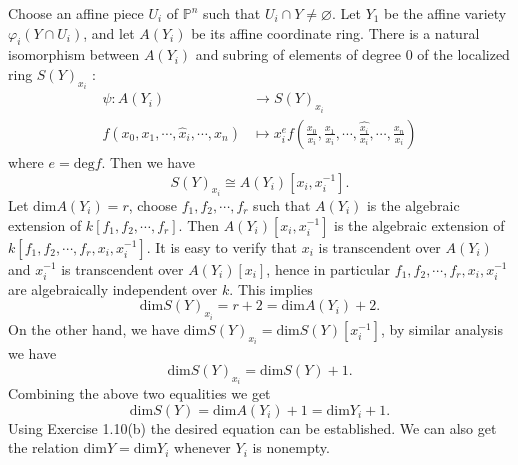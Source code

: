   \begin{solution}
    Choose an affine piece $U_i$ of $\mathbb{P}^{n}$ such that $U_i\cap Y\neq \varnothing$. Let $Y_1$ be the affine variety  $\varphi_i(Y\cap U_i)$, and let $A(Y_i)$ be its affine coordinate ring. There is a natural isomorphism between $A(Y_i)$ and subring of elements of degree  $0$ of the localized ring $S(Y)_{x_i}$ :
    \begin{align*}
      \psi: A(Y_i) &\longrightarrow S(Y)_{x_i} \\
      f(x_0,x_1,\cdots,\hat{x}_i,\cdots,x_n) &\longmapsto x_i^{e}f\left( \frac{x_0}{x_i}, \frac{x_1}{x_i},\cdots,\widehat{\frac{x_i}{x_i}},\cdots,\frac{x_n}{x_i} \right) 
    \end{align*}
   where $e=\mathrm{deg}f$.
    Then we have 
    \[
      S(Y)_{x_i}\cong A(Y_i)[x_i,x_i^{-1}].
    \] 
    Let $\mathrm{dim}A(Y_i)=r$, choose $f_1,f_2,\cdots,f_r$ such that $A(Y_i)$ is the algebraic extension of $k[f_1,f_2,\cdots,f_r]$. Then $A(Y_i)[x_i,x_i^{-1}]$ is the algebraic extension of $k[f_1,f_2,\cdots,f_r,x_i,x_i^{-1}]$. It is easy to verify that $x_i$ is transcendent over $A(Y_i)$ and $x_i^{-1}$ is transcendent over $A(Y_i)[x_i]$, hence in particular  $f_1,f_2,\cdots,f_r,x_{i},x_i^{-1}$ are algebraically independent over $k$. This implies 
    \[
      \mathrm{dim}S(Y)_{x_i}=r+2=\mathrm{dim}A(Y_i)+2.
    \] 
    On the other hand, we have $\mathrm{dim}S(Y)_{x_i}=\mathrm{dim}S(Y)[x_i^{-1}]$, by similar analysis we have
    \[
      \mathrm{dim}S(Y)_{x_i}=\mathrm{dim}S(Y)+1.
    \] 
    Combining the above two equalities we get 
    \[
      \mathrm{dim}S(Y)=\mathrm{dim}A(Y_i)+1=\mathrm{dim}Y_i +1.
    \] 
    Using Exercise 1.10(b) the desired equation can be established. We can also get the relation
    $\mathrm{dim}Y=\mathrm{dim}Y_i$ whenever $Y_i$ is nonempty.
  \end{solution}
 
